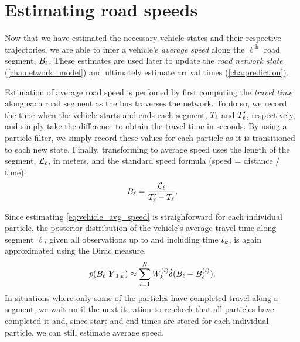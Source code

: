 \section{Estimating road speeds}
\label{sec:vehicle_speeds}

Now that we have estimated the necessary vehicle states and their respective trajectories, we are able to infer a vehicle's \emph{average speed} along the $\ell^\text{th}$ road segment, $B_{\ell}$. These estimates are used later to update the \emph{road network state} (\cref{cha:network_model}) and ultimately estimate arrival times (\cref{cha:prediction}).


Estimation of average road speed is perfomed by first computing the \emph{travel time} along each road segment as the bus traverses the network. To do so, we record the time when the vehicle starts and ends each segment, $T_\ell$ and $T'_\ell$, respectively, and simply take the difference to obtain the travel time in seconds. By using a particle filter, we simply record these values for each particle as it is transitioned to each new state. Finally, transforming to average speed uses the length of the segment, $\mathcal{L}_\ell$, in meters, and the standard speed formula (speed = distance / time):
\begin{equation}
\label{eq:vehicle_avg_speed}
B_\ell = \frac{\mathcal{L}_\ell}{T'_\ell - T_\ell}.
\end{equation}


Since estimating \cref{eq:vehicle_avg_speed} is straighforward for each individual particle, the posterior distribution of the vehicle's average travel time along segment $\ell$, given all observations up to and including time $t_k$, is again approximated using the Dirac measure,
\begin{equation}
\label{eq:pf_speed_dist}
p(B_\ell | \boldsymbol{Y}_{1:k}) \approx
\sum_{i=1}^N W^{(i)}_k \dot\delta(B_\ell - B^{(i)}_\ell).
\end{equation}
In situations where only some of the particles have completed travel along a segment, we wait until the next iteration to re-check that all particles have completed it and, since start and end times are stored for each individual particle, we can still estimate average speed.



